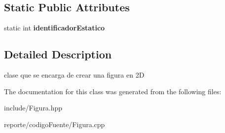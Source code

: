 \subsection*{Static Public Attributes}
\begin{DoxyCompactItemize}
\item 
\mbox{\label{class_figura_a60194064f555094d45a289fa234eac85}} 
static int {\bfseries identificador\+Estatico}
\end{DoxyCompactItemize}


\subsection{Detailed Description}
clase que se encarga de crear una figura en 2D 

The documentation for this class was generated from the following files\+:\begin{DoxyCompactItemize}
\item 
include/Figura.\+hpp\item 
reporte/codigo\+Fuente/Figura.\+cpp\end{DoxyCompactItemize}
